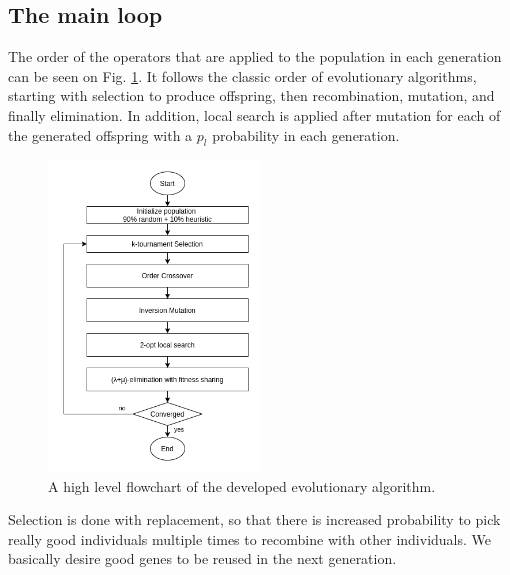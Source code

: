 \documentclass[a4paper,10pt]{article}
\newcommand{\ReplaceMe}[1]{{\color{blue}#1}}
\begin{document}
\subsection{The main loop} \label{ss:main_loop}


The order of the operators that are applied to the population in each generation can be seen on Fig. \ref{fig:main_loop}. It follows the classic order of evolutionary algorithms, starting with selection to produce offspring, then recombination, mutation, and finally elimination. In addition, local search is applied after mutation for each of the generated offspring with a $p_l$ probability in each generation.

\begin{figure}[H]
\centering
\includegraphics[width=0.5\textwidth]{images/genetic_algorthm_main_loop.png}
\caption{A high level flowchart of the developed evolutionary algorithm.}
\label{fig:main_loop}
\end{figure}

Selection is done with replacement, so that there is increased probability to pick really good individuals multiple times to recombine with other individuals. We basically desire good genes to be reused in the next generation.
\end{document}
